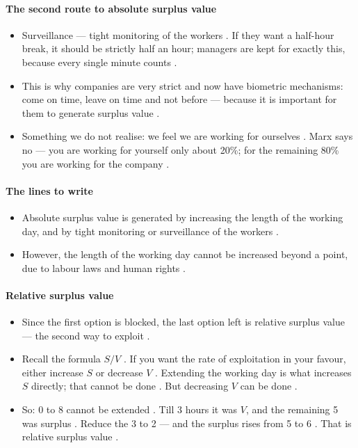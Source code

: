 \paragraph{The second route to absolute surplus value}
\begin{itemize}
    \item Surveillance --- tight monitoring of the workers . If they want a half-hour break, it should be strictly half an hour; managers are kept for exactly this, because every single minute counts .
    \item This is why companies are very strict and now have biometric mechanisms: come on time, leave on time and not before --- because it is important for them to generate surplus value .
    \item Something we do not realise: we feel we are working for ourselves . Marx says no --- you are working for yourself only about 20\%; for the remaining 80\% you are working for the company .
\end{itemize}

\paragraph{The lines to write}
\begin{itemize}
    \item Absolute surplus value is generated by increasing the length of the working day, and by tight monitoring or surveillance of the workers .
    \item However, the length of the working day cannot be increased beyond a point, due to labour laws and human rights .
\end{itemize}

\paragraph{Relative surplus value}
\begin{itemize}
    \item Since the first option is blocked, the last option left is relative surplus value --- the second way to exploit .
    \item Recall the formula $S/V$ . If you want the rate of exploitation in your favour, either increase $S$ or decrease $V$ . Extending the working day is what increases $S$ directly; that cannot be done . But decreasing $V$ can be done .
    \item So: 0 to 8 cannot be extended . Till 3 hours it was $V$, and the remaining 5 was surplus . Reduce the 3 to 2 --- and the surplus rises from 5 to 6 . That is relative surplus value .
\end{itemize}

